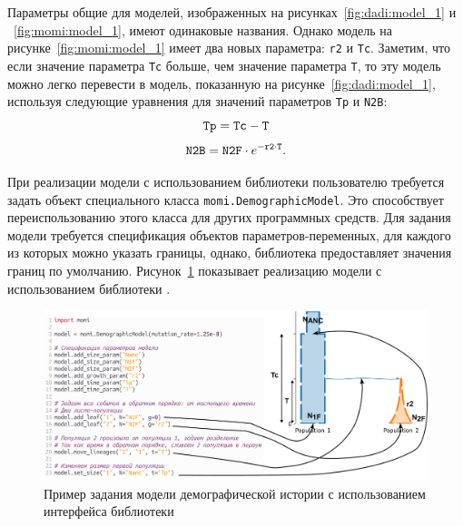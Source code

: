 \documentclass[a4paper,14pt,oneside,openany,article]{memoir}
\begin{document}
Параметры общие для моделей, изображенных на рисунках~\ref{fig:dadi:model_1} и ~\ref{fig:momi:model_1}, имеют одинаковые названия.
Однако модель на рисунке~\ref{fig:momi:model_1} имеет два новых параметра: \texttt{r2} и \texttt{Tc}.
Заметим, что если значение параметра \texttt{Tc} больше, чем значение параметра \texttt{T}, то эту модель можно легко перевести в модель, показанную на рисунке~\ref{fig:dadi:model_1}, используя следующие уравнения для значений параметров \texttt{Tp} и \texttt{N2B}:
$$\text{\texttt{Tp}} = \text{\texttt{Tc}} - \text{\texttt{T}}$$ 
$$\text{\texttt{N2B}} = \text{\texttt{N2F}} \cdot e^{-\text{\texttt{r2}}\cdot \text{\texttt{T}}}.$$

При реализации модели с использованием библиотеки \momi пользователю требуется задать объект специального класса \texttt{momi.DemographicModel}.
Это способствует переиспользованию этого класса для других программных средств.
Для задания модели требуется спецификация объектов параметров-переменных, для каждого из которых можно указать границы, однако, библиотека предоставляет значения границ по умолчанию.
Рисунок~\ref{fig:momi:model_spec} показывает реализацию модели с использованием библиотеки \momi.
\begin{figure}[h!]
    \centering
    \includegraphics[width=\linewidth]{images_2/momi_model.pdf}
    \caption{Пример задания модели демографической истории с
использованием интерфейса библиотеки \momi}
    \label{fig:momi:model_spec}
\end{figure}
\end{document}
